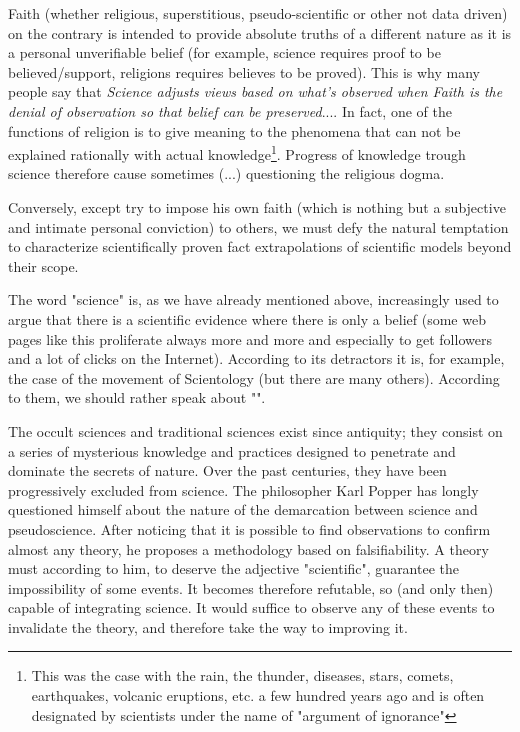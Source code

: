 	Faith (whether religious, superstitious, pseudo-scientific or other not data driven) on the contrary is intended to provide absolute truths of a different nature as it is a personal unverifiable belief (for example, science requires proof to be believed/support, religions requires believes to be proved). This is why many people say that \textit{Science adjusts views based on what's observed when Faith is the denial of observation so that belief can be preserved}.... In fact, one of the functions of religion is to give meaning to the phenomena that can not be explained rationally with actual knowledge\footnote{This was the case with the rain, the thunder, diseases, stars, comets, earthquakes, volcanic eruptions, etc. a few hundred years ago and is often designated by scientists under the name of "argument of ignorance"}. Progress of knowledge trough science therefore cause sometimes (...) questioning the religious dogma. 

	Conversely, except try to impose his own faith (which is nothing but a subjective and intimate personal conviction) to others, we must defy the natural temptation to characterize scientifically proven fact extrapolations of scientific models beyond their scope.

	The word "science" is, as we have already mentioned above, increasingly used to argue that there is a scientific evidence where there is only a belief (some web pages like this proliferate always more and more and especially to get followers and a lot of clicks on the Internet). According to its detractors it is, for example, the case of the movement of Scientology (but there are many others). According to them, we should rather speak about "".

	The occult sciences and traditional sciences exist since antiquity; they consist on a series of mysterious knowledge and practices designed to penetrate and dominate the secrets of nature. Over the past centuries, they have been progressively excluded from science. The philosopher Karl Popper has longly questioned himself about the nature of the demarcation between science and pseudoscience. After noticing that it is possible to find observations to confirm almost any theory, he proposes a methodology based on falsifiability. A theory must according to him, to deserve the adjective "scientific", guarantee the impossibility of some events. It becomes therefore refutable, so (and only then) capable of integrating science. It would suffice to observe any of these events to invalidate the theory, and therefore take the way to improving it.
	
